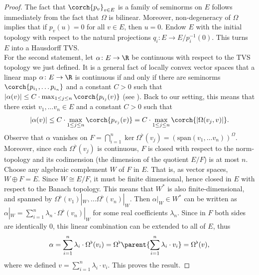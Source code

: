 \begin{proof}
    The fact that \(\corch{p_v}_{v \in E}\) is a family of seminorms on \(E\) follows immediately from the fact that \(\Omega\) is bilinear. Moreover, non-degeneracy of \(\Omega\) implies that if \(p_v(u)=0\) for all \(v\in E\), then \(u=0\). Endow \(E\) with the initial topology with respect to the natural projections \(q_i\colon E\to E/p_i^{-1}(0)\). This turns \(E\) into a Hausdorff TVS. \\

    For the second statement, let \(\alpha\colon E \to \R\) be continuous with respect to the TVS topology we just defined. It is a general fact of locally convex vector spaces that a linear map \(\alpha \colon E \to \R\) is continuous if and only if there are seminorms \(\corch{p_{i_1}, \ldots p_{i_n}}\) and a constant \(C>0\) such that \(|\alpha(v)| \leq C \cdot \max_{1 \leq j \leq n} \corch{p_{i_j}(v)}\) (see \parencite[Lemma 1.4.2 and Lemma 3.4.2]{Andreas}). Back to our setting, this means that there exist \(v_1, \ldots v_n \in E\) and a constant \(C>0\) such that 
    \[
    |\alpha(v)| \leq C \cdot  \max_{1 \leq j \leq n} \corch{p_{v_j}(v)}=C \cdot \max_{1 \leq j \leq n} \corch{|\Omega(v_j, v)|}.
    \]
    Observe that \(\alpha\) vanishes on \(F=\bigcap_{i=1}^n\ker \Omega^\flat(v_j)=(\mathrm{span}(v_1, \ldots v_n))^\Omega.\) Moreover, since each \(\Omega^\flat(v_j)\) is continuous, \(F\) is closed with respect to the norm-topology and its codimension (the dimension of the quotient \(E/F\)) is at most \(n\). Choose any algebraic complement \(W\) of \(F\) in \(E\). That is, as vector spaces, \(W \oplus F=E\). Since \(W \cong E/F\), it must be finite dimensional, hence closed in \(E\) with respect to the Banach topology. This means that \(W^*\) is also finite-dimensional, and spanned by \(\Omega^\flat(v_1)|_W, \ldots \Omega^\flat(v_n)|_W\). Then \(\alpha |_W \in W^*\) can be written as \(\alpha|_W=\sum_{i=1}^n \lambda_n \cdot \Omega^\flat(v_n)|_W\) for some real coefficients \(\lambda_n\). Since in \(F\) both sides are identically \(0\), this linear combination can be extended to all of \(E\), thus
    \[
    \alpha = \sum_{i=1}^n \lambda_i \cdot \Omega^\flat(v_i)= \Omega^\flat\parent{\sum_{i=1}^n \lambda_i \cdot v_i}=\Omega^\flat(v),
    \]
    where we defined \(v=\sum_{i=1}^n \lambda_i \cdot v_i\). This proves the result.
\end{proof}

